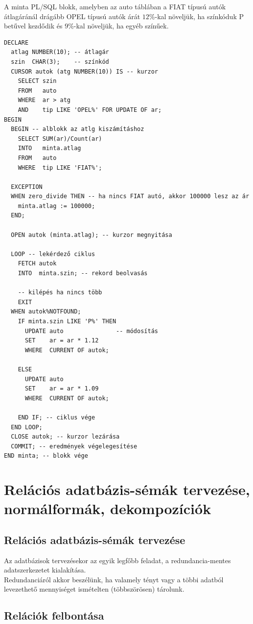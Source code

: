 \documentclass[tikz,12pt,margin=0px]{article}
\begin{document}
    \noindent A minta PL/SQL blokk, amelyben az auto táblában a FIAT típusú autók átlagáránál drágább OPEL típusú autók árát $12\%$-kal növeljük, ha színkóduk P betűvel kezdődik és $9\%$-kal növeljük, ha egyéb színűek.
{\small
\begin{verbatim}
DECLARE
  atlag NUMBER(10); -- átlagár
  szin  CHAR(3);    -- színkód
  CURSOR autok (atg NUMBER(10)) IS -- kurzor
    SELECT szin
    FROM   auto
    WHERE  ar > atg
    AND    tip LIKE 'OPEL%' FOR UPDATE OF ar;
BEGIN
  BEGIN -- alblokk az atlg kiszámításhoz
    SELECT SUM(ar)/Count(ar)
    INTO   minta.atlag
    FROM   auto
    WHERE  tip LIKE 'FIAT%';

  EXCEPTION
  WHEN zero_divide THEN -- ha nincs FIAT autó, akkor 100000 lesz az ár
    minta.atlag := 100000;
  END;

  OPEN autok (minta.atlag); -- kurzor megnyitása

  LOOP -- lekérdező ciklus
    FETCH autok
    INTO  minta.szin; -- rekord beolvasás

    -- kilépés ha nincs több
    EXIT
  WHEN autok%NOTFOUND;
    IF minta.szin LIKE 'P%' THEN
      UPDATE auto               -- módosítás
      SET    ar = ar * 1.12
      WHERE  CURRENT OF autok;

    ELSE
      UPDATE auto
      SET    ar = ar * 1.09
      WHERE  CURRENT OF autok;

    END IF; -- ciklus vége
  END LOOP;
  CLOSE autok; -- kurzor lezárása
  COMMIT; -- eredmények végelegesítése
END minta; -- blokk vége
\end{verbatim}
}

	\section*{Relációs adatbázis-sémák tervezése, normálformák, dekompozíciók}
	
	\subsection*{Relációs adatbázis-sémák tervezése}
	
    \noindent Az adatbázisok tervezésekor az egyik legfőbb feladat, a redundancia-mentes adatszerkezetet kialakítása.\\

    \noindent Redundanciáról akkor beszélünk, ha valamely tényt vagy a többi adatból levezethető mennyiséget ismételten (többszörösen) tárolunk.

	\subsection*{Relációk felbontása}
\end{document}
